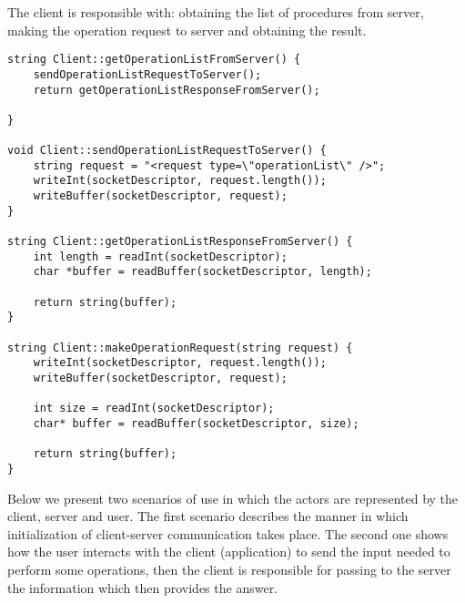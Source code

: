 \documentclass{llncs}
\begin{document}
The client is responsible with: obtaining the list of procedures from server, making the operation  request  to server and obtaining the result.


 \begin{lstlisting}
string Client::getOperationListFromServer() {
    sendOperationListRequestToServer();
    return getOperationListResponseFromServer();

}

void Client::sendOperationListRequestToServer() {
    string request = "<request type=\"operationList\" />";
    writeInt(socketDescriptor, request.length());
    writeBuffer(socketDescriptor, request);
}

string Client::getOperationListResponseFromServer() {
    int length = readInt(socketDescriptor);
    char *buffer = readBuffer(socketDescriptor, length);

    return string(buffer);
}

string Client::makeOperationRequest(string request) {
    writeInt(socketDescriptor, request.length());
    writeBuffer(socketDescriptor, request);

    int size = readInt(socketDescriptor);
    char* buffer = readBuffer(socketDescriptor, size);

    return string(buffer);
}
\end{lstlisting}



Below we present two scenarios of use in which the actors are represented by the client, server and user. The first scenario describes the manner in which initialization of client-server communication takes place. The second one shows how the user interacts with the client (application) to send the input needed to perform some operations, then the client is responsible for passing to the server the information which then provides the answer.
\end{document}
